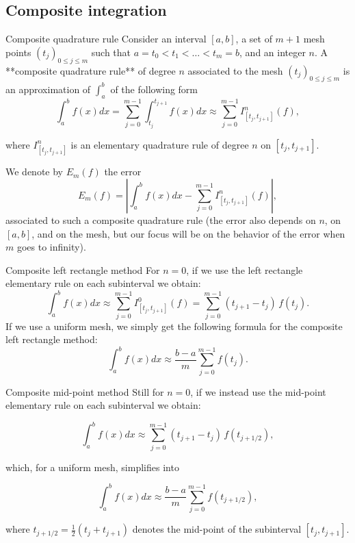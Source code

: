 \documentclass{article}
\begin{document}
    \subsection{Composite integration}

    \begin{definition}{Composite quadrature rule}
        Consider an interval $[a,b]$, a set of $m+1$ mesh points $(t_j)_{0\leq j\leq m}$ such that $a = t_0 < t_1 < \ldots < t_m = b$, and an integer $n$. A **composite quadrature rule** of degree $n$ associated to the mesh $(t_j)_{0\leq j\leq m}$ is an approximation of $\int_a^b$ of the following form 
        $$
        \int_a^b f(x)dx = \sum_{j=0}^{m-1} \int_{t_j}^{t_{j+1}} f(x)dx  \approx \sum_{j=0}^{m-1} I^n_{[t_j,t_{j+1}]}(f),
        $$
        
        where $I^n_{[t_j,t_{j+1}]}$ is an elementary quadrature rule of degree $n$ on $[t_j,t_{j+1}]$.
        
        We denote by $E_m(f)$ the error
        $$
        E_m(f) = \left\vert \int_a^b f(x)dx - \sum_{j=0}^{m-1} I^n_{[t_j,t_{j+1}]}(f) \right\vert ,
        $$
        associated to such a composite quadrature rule (the error also depends on $n$, on $[a,b]$, and on the mesh, but our focus will be on the behavior of the error when $m$ goes to infinity).
    \end{definition}

    \vspace{10pt}

    \begin{other}{Composite left rectangle method}
        \vspace{4pt}
        \noindent
        For $n=0$, if we use the left rectangle elementary rule on each subinterval we obtain:
        $$
        \int_a^b f(x)dx  \approx \sum_{j=0}^{m-1} I^0_{[t_j,t_{j+1}]}(f) = \sum_{j=0}^{m-1} (t_{j+1}-t_j)\,f(t_j).
        $$
        If we use a uniform mesh, we simply get the following formula for the composite left rectangle method:
        $$
        \int_a^b f(x)dx  \approx \frac{b-a}{m}\sum_{j=0}^{m-1} f(t_j).
        $$
    \end{other}

    \vspace{10pt}

    \begin{other}{Composite mid-point method}
        Still for $n=0$, if we instead use the mid-point elementary rule on each subinterval we obtain:
        
        $$
        \int_a^b f(x)dx  \approx \sum_{j=0}^{m-1} (t_{j+1}-t_j)\,f(t_{j+1/2}),
        $$
        
        which, for a uniform mesh, simplifies into
        
        $$
        \int_a^b f(x)dx  \approx \frac{b-a}{m}\sum_{j=0}^{m-1} f(t_{j+1/2}),
        $$
        
        where $t_{j+1/2} = \frac{1}{2}(t_j+t_{j+1})$ denotes the mid-point of the subinterval $[t_j,t_{j+1}]$.
    \end{other}
\end{document}
